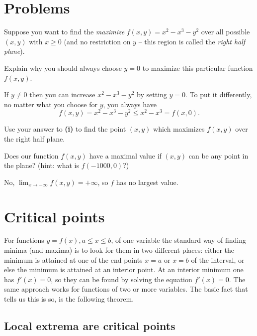 \section{Problems} %
\problemstyle

\problem Suppose you want to find the \emph{maximize} $f(x, y) =
x^2-x^3-y^2$ over all possible $(x,y)$ with $x\geq 0$ (and no restriction
on $y$ -- this region is called the \textit{right half plane}).

\subprob Explain why you should always choose $y=0$ to maximize this
particular function $f(x, y)$.

\answer If $y\neq0$ then you can increase $x^2-x^3-y^2$ by setting $y=0$.
To put it differently, no matter what you choose for $y$, you always have
\[
f(x, y) = x^2-x^3-y^2 \leq x^2-x^3  =  f(x, 0).
\]
\endanswer

\subprob Use your answer to \textbf{(i)} to find the point $(x, y)$ which
maximizes $f(x,y)$ over the right half plane.

\subprob Does our function $f(x,y)$ have a maximal value if $(x,y)$ can be
any point in the plane?  (hint: what is $f(-1000, 0)$?)

\answer
No, $\lim_{x\to-\infty} f(x, y) = +\infty$, so $f$ has no largest value.
\endanswer

\rmfamily\normalsize

\section{Critical points}  %
For functions $y=f(x), a\leq x\leq b$, of one variable the standard way of
finding minima (and maxima) is to look for them in two different places:
either the minimum is attained at one of the end points $x=a$ or $x=b$ of
the interval, or else the minimum is attained at an interior point.  At an
interior minimum one has $f'(x) = 0$, so they can be found by solving the
equation $f'(x) = 0$.  The same approach works for functions of two or more
variables.  The basic fact that tells us this is so, is the following
theorem.

\subsection{Local extrema are critical points}  %

